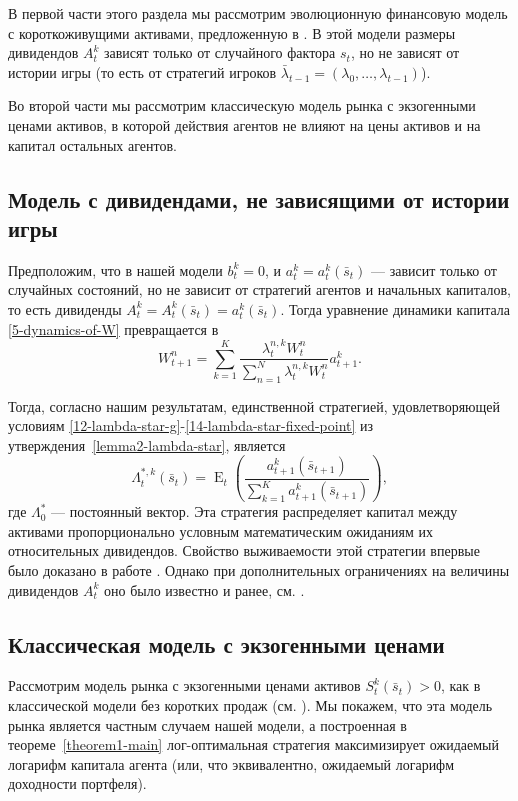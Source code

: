\documentclass[a4paper,12pt,russian]{article} %
\theoremstyle{definition}
\DeclareMathOperator{\E}{E}
\begin{document}
В первой части этого раздела мы рассмотрим эволюционную финансовую модель с короткоживущими активами, предложенную в \cite{Amir2013}. В этой модели размеры дивидендов $A_t^k$ зависят только от случайного фактора $s_t$, но не зависят от истории игры (то есть от стратегий игроков $\bar\lambda_{t-1} =(\lambda_0, \dots, \lambda_{t-1})$).

Во второй части мы рассмотрим классическую модель рынка с экзогенными ценами активов, в которой действия агентов не влияют на цены активов и на капитал остальных агентов.


\subsection{Модель с дивидендами, не зависящими от истории игры} 


Предположим, что в нашей модели $b_t^k=0$, и $a_t^k=a_t^k(\bar s_t)$ — зависит только от случайных состояний, но не зависит от стратегий агентов и начальных капиталов, то есть дивиденды $A_t^k=A_t^k(\bar s_t) = a_t^k(\bar s_t)$. Тогда уравнение динамики капитала \eqref{5-dynamics-of-W} превращается в 
\[
W_{t+1}^n = \sum_{k=1}^K 
\frac{\lambda_{t}^{n,k} W_t^n}{\sum_{n=1}^N \lambda_{t}^{n,k} W_t^n} a_{t+1}^k.
\]

Тогда, согласно нашим результатам, единственной стратегией, удовлетворяющей условиям \eqref{12-lambda-star-g}-\eqref{14-lambda-star-fixed-point} из утверждения~\ref{lemma2-lambda-star}, является \[
\Lambda_{t}^{*,k}(\bar s_t) 
= \E_t\left(\frac{a_{t+1}^k(\bar s_{t+1})}{\sum_{k=1}^K a_{t+1}^k(\bar s_{t+1})}\right),
\]
где $\Lambda^*_0$ — постоянный вектор. 
Эта стратегия распределяет капитал между активами пропорционально условным математическим ожиданиям их относительных дивидендов. Свойство выживаемости этой стратегии впервые было доказано в работе \cite{Amir2013}. Однако при дополнительных ограничениях на величины дивидендов $A_{t}^k$ оно было известно и ранее, см. \cite{BlumeEasley1992, AmirEvstigneev2005, Evstigneev2002}.


\subsection{Классическая модель с экзогенными ценами}
Рассмотрим модель рынка с экзогенными ценами активов $S_{t}^k(\bar s_t)>0$, 
как в классической модели без коротких продаж  (см. \cite[Гл.~5]{FollmerSchied2011}). Мы покажем, что эта модель рынка является частным случаем нашей модели, а построенная в теореме~\ref{theorem1-main} лог-оптимальная стратегия максимизирует ожидаемый логарифм капитала агента (или, что эквивалентно, ожидаемый логарифм доходности портфеля).
\end{document}
